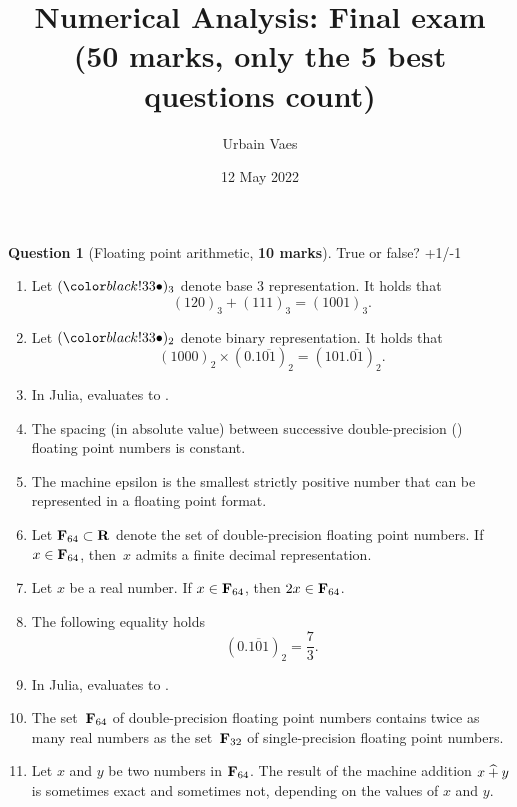 \documentclass[11pt]{article}
\theoremstyle{definition}
\newtheorem{question}{Question}
\theoremstyle{remark}
\begin{document}
\title{Numerical Analysis: Final exam \\
\small{(\textbf{50 marks}, only the 5 best questions count)}}
\author{Urbain Vaes}
\date{12 May 2022}
\maketitle

\begin{question}
    [Floating point arithmetic, \textbf{10 marks}]
    True or false? +1/-1
    \begin{enumerate}
        \item
            Let $(\placeholder)_3$ denote base 3 representation.
            It holds that
            \[
                (120)_3 + (111)_3 = (1001)_3.
            \]
        \item
            Let $(\placeholder)_2$ denote binary representation.
            It holds that
            \[
                (1000)_2 \times (0.1\overline{01})_2 = (101.\overline{01})_2.
            \]

        \item
            In Julia,  evaluates to .

        \item
            The spacing (in absolute value) between successive double-precision () floating point numbers is constant.

        \item
            The machine epsilon is the smallest strictly positive number that can be represented in a floating point format.

        \item
            Let $\mathbf F_{64} \subset \mathbf R$ denote the set of double-precision floating point numbers.
            If $x \in \mathbf F_{64}$, then~$x$ admits a finite decimal representation.

        \item
            Let $x$ be a real number. If $x \in \mathbf F_{64}$, then $2x \in \mathbf F_{64}$.

        \item
            The following equality holds
            \[
                (0.\overline{101})_2 = \frac{7}{3}.
            \]

        \item
            In Julia,  evaluates to .

        \item
            The set~$\mathbf F_{64}$ of double-precision floating point numbers contains twice as many real numbers
            as the set~$\mathbf F_{32}$ of single-precision floating point numbers.

        \item
            Let $x$ and $y$ be two numbers in $\mathbf F_{64}$.
            The result of the machine addition $x \mathbin{\widehat +} y$ is sometimes exact and sometimes not,
            depending on the values of $x$ and $y$.
    \end{enumerate}
\end{question}
\end{document}
